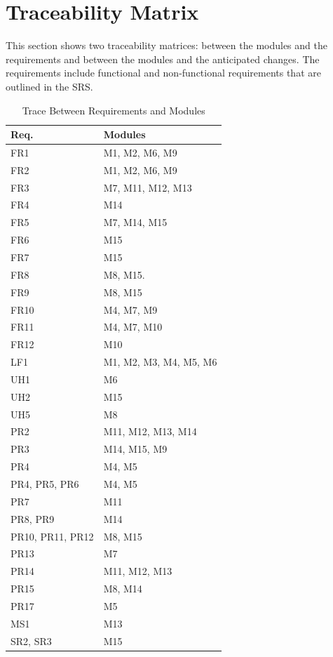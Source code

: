 \documentclass[12pt, titlepage]{article}
\begin{document}
\section{Traceability Matrix} \label{SecTM}

This section shows two traceability matrices: between the modules and the
requirements and between the modules and the anticipated changes. The requirements include functional and non-functional requirements that are outlined in the SRS.

\begin{table}[H]
\centering
\begin{tabular}{p{} p{}}
\toprule
\textbf{Req.} & \textbf{Modules}\\
\midrule
FR1 & M1, M2, M6, M9\\
FR2 & M1, M2, M6, M9\\
FR3 & M7, M11, M12, M13\\
FR4 & M14\\
FR5 & M7, M14, M15\\
FR6 & M15\\
FR7 & M15\\
FR8 & M8, M15. \\
FR9 & M8, M15\\
FR10 & M4, M7, M9\\
FR11 & M4, M7, M10 \\
FR12 & M10\\
LF1 & M1, M2, M3, M4, M5, M6\\
UH1 & M6\\
UH2 & M15\\
UH5 & M8\\
PR2 & M11, M12, M13, M14\\
PR3 & M14, M15, M9\\
PR4 & M4, M5\\
PR4, PR5, PR6 & M4, M5\\
PR7 & M11\\
PR8, PR9 & M14\\
PR10, PR11, PR12 & M8, M15\\
PR13 & M7\\
PR14 & M11, M12, M13\\
PR15 & M8, M14\\
PR17 & M5\\
MS1 & M13\\
SR2, SR3 & M15\\


\bottomrule
\end{tabular}
\caption{Trace Between Requirements and Modules}
\label{TblRT}
\end{table}
\end{document}

